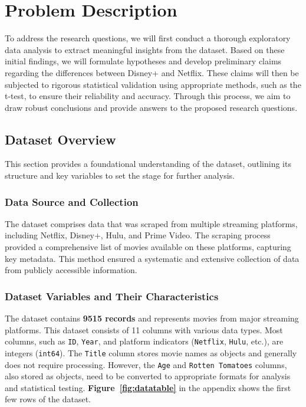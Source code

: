 \documentclass[a4paper, 12pt]{article}
\begin{document}
\section{Problem Description}

To address the research questions, we will first conduct a thorough exploratory data analysis to extract meaningful insights from the dataset. Based on these initial findings, we will formulate hypotheses and develop preliminary claims regarding the differences between Disney+ and Netflix. These claims will then be subjected to rigorous statistical validation using appropriate methods, such as the t-test, to ensure their reliability and accuracy. Through this process, we aim to draw robust conclusions and provide answers to the proposed research questions.

\subsection{Dataset Overview}

This section provides a foundational understanding of the dataset, outlining its structure and key variables to set the stage for further analysis.

\subsubsection{Data Source and Collection}

The dataset comprises data that was scraped from multiple streaming platforms, including Netflix, Disney+, Hulu, and Prime Video. The scraping process provided a comprehensive list of movies available on these platforms, capturing key metadata. This method ensured a systematic and extensive collection of data from publicly accessible information.



\subsubsection{Dataset Variables and Their Characteristics}

The dataset contains \textbf{9515 records} and represents movies from major streaming platforms. This dataset consists of 11 columns with various data types. Most columns, such as \texttt{ID}, \texttt{Year}, and platform indicators (\texttt{Netflix}, \texttt{Hulu}, etc.), are integers (\texttt{int64}). The \texttt{Title} column stores movie names as objects and generally does not require processing. However, the \texttt{Age} and \texttt{Rotten Tomatoes} columns, also stored as objects, need to be converted to appropriate formats for analysis and statistical testing. \textbf{Figure~\ref{fig:datatable}} in the appendix shows the first few rows of the dataset.
\end{document}
